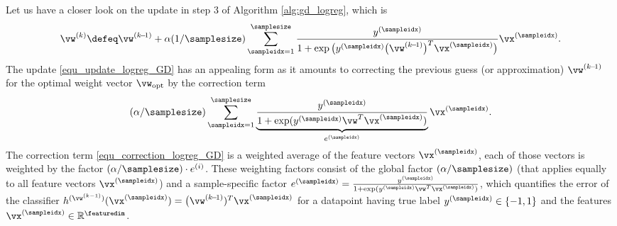 \documentclass[12pt]{report}
\begin{document}
Let us have a closer look on the update in step $3$ of Algorithm \ref{alg:gd_logreg}, which is 
\begin{equation}
\label{equ_update_logreg_GD}
\vw^{(k)} \defeq \vw^{(k\!-\!1)} + \alpha (1/\samplesize) \sum_{\sampleidx=1}^{\samplesize} \frac{y^{(\sampleidx)}}{1 + \exp \big( y^{(\sampleidx)} \big( \vw^{(k\!-\!1)}  \big)^{T} \vx^{(\sampleidx)}\big)} \vx^{(\sampleidx)}. 
\end{equation}
The update \eqref{equ_update_logreg_GD} has an appealing form as it amounts to correcting the previous 
guess (or approximation) $\vw^{(k\!-\!1)}$ for the optimal weight vector $\vw_{\rm opt}$ by the correction term 
\begin{equation}
\label{equ_correction_logreg_GD}
(\alpha/\samplesize) \sum_{\sampleidx=1}^{\samplesize} \underbrace{ \frac{y^{(\sampleidx)}}{1 + \exp ( y^{(\sampleidx)} \vw^{T} \vx^{(\sampleidx)})}}_{e^{(\sampleidx)}} \vx^{(\sampleidx)}. 
\end{equation}
The correction term \eqref{equ_correction_logreg_GD} is a weighted average of the feature vectors $\vx^{(\sampleidx)}$, 
each of those vectors is weighted by the factor $(\alpha/\samplesize) \cdot e^{(i)}$. These weighting factors consist of 
the global factor $(\alpha/\samplesize)$ (that applies equally to all feature vectors $\vx^{(\sampleidx)}$) and a sample-specific 
factor $e^{(\sampleidx)} =  \frac{y^{(\sampleidx)}}{1 + \exp ( y^{(\sampleidx)} \vw^{T} \vx^{(\sampleidx)})}$, which quantifies 
the error of the classifier  $h^{(\vw^{(k-1)})}(\vx^{(\sampleidx)}) =   \big(\vw^{(k\!-\!1)})^{T} \vx^{(\sampleidx)}$ for a datapoint 
having true label $y^{(\sampleidx)} \in \{-1,1\}$ and the features $\vx^{(\sampleidx)} \in \mathbb{R}^{\featuredim}$. 
\end{document}
